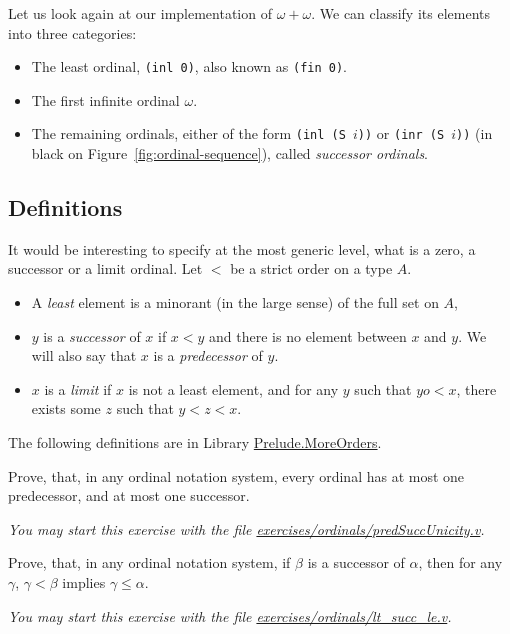 Let us look again at our implementation of $\omega+\omega$. We can classify its elements into three categories:

\begin{itemize}
\item The least ordinal, \texttt{(inl 0)}, also known as  \texttt{(fin 0)}.
\item The first infinite ordinal $\omega$.
\item The remaining ordinals, either of the form \texttt{(inl (S $i$))} or \texttt{(inr (S $i$))} (in black on Figure~\ref{fig:ordinal-sequence}), called \emph{successor ordinals}.
\end{itemize}

\subsection{Definitions}
It would be interesting to specify at the most generic level, what is a zero, a successor or a limit ordinal. Let $<$ be a strict order on a type $A$.

\begin{itemize}
\item A \emph{least} element is a minorant (in the large sense) of the full set  on $A$,
\item $y$ is a \emph{successor} of $x$ if $x<y$ and there is no element between $x$ and $y$. We will also say that $x$ is a \emph{predecessor} of $y$.
\item $x$ is a \emph{limit} if $x$ is not a least element, and for any $y$ such that $yo<x$,
 there exists some $z$ such that $y<z<x$.
\end{itemize}


The following definitions are in Library \href{../theories/html/hydras.Prelude.MoreOrders.html}{Prelude.MoreOrders}.




\begin{exercise}
Prove, that, in any ordinal notation system, every ordinal has at most one predecessor, and at most one successor. 

\emph{You may start this exercise with the file
\href{https://github.com/coq-community/hydra-battles/blob/master/exercises/ordinals/predSuccUnicity.v}{exercises/ordinals/predSuccUnicity.v}.}

\end{exercise}

\begin{exercise}
Prove, that, in any ordinal notation system, if $\beta$ is a successor of $\alpha$,
then for any $\gamma$, $\gamma<\beta$ implies 
$\gamma\leq\alpha$.

\emph{You may start this exercise with the file
\href{https://github.com/coq-community/hydra-battles/blob/master/exercises/ordinals/lt_succ_le.v}{exercises/ordinals/lt\_succ\_le.v}.}
\end{exercise}




